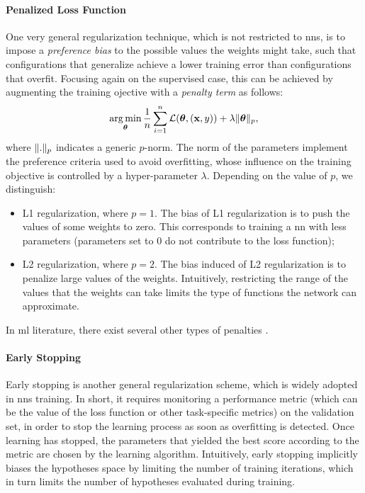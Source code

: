 \paragraph{Penalized Loss Function}
One very general regularization technique, which is not restricted to \glspl{nn}, is to impose a \emph{preference bias} to the possible values the weights might take, such that configurations that generalize achieve a lower training error than configurations that overfit. Focusing again on the supervised case, this can be achieved by augmenting the training ojective with a \emph{penalty term} as follows:
$$\argmin_{\Param} \frac{1}{n} \sum_{i=1}^n \Loss(\Param, (\Vector{x}, y)) + \lambda\norm{\Param}_p,$$
where $\mathopen\| . \mathclose\|_p$ indicates a generic $p$-norm. The norm of the parameters implement the preference criteria used to avoid overfitting, whose influence on the training objective is controlled by a hyper-parameter $\lambda$. Depending on the value of $p$, we distinguish:
\begin{itemize}
    \item L1 regularization, where $p=1$. The bias of L1 regularization is to push the values of some weights to zero. This corresponds to training a \gls{nn} with less parameters (parameters set to 0 do not contribute to the loss function);
    \item L2 regularization, where $p=2$. The bias induced of L2 regularization is to penalize large values of the weights. Intuitively, restricting the range of the values that the weights can take limits the type of functions the network can approximate.
\end{itemize}
In \gls{ml} literature, there exist several other types of penalties \citep{hastie2009elements}.

\paragraph{Early Stopping}
Early stopping \citep{prechelt1998earlystopping} is another general regularization scheme, which is widely adopted in \glspl{nn} training. In short, it requires monitoring a performance metric (which can be the value of the loss function or other task-specific metrics) on the validation set, in order to stop the learning process as soon as overfitting is detected. Once learning has stopped, the parameters that yielded the best score according to the metric are chosen by the learning algorithm. Intuitively, early stopping implicitly biases the hypotheses space by limiting the number of training iterations, which in turn limits the number of hypotheses evaluated during training.

